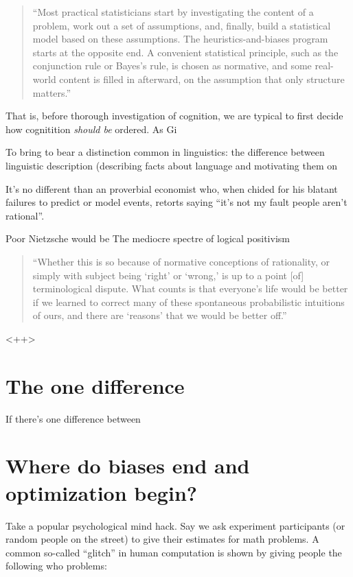 \documentclass{article}
\begin{document}
\begin{quotation}
	``Most practical statisticians start by investigating the content of a problem, work out a set of assumptions, and, finally, build a statistical model based on these assumptions.
	The heuristics-and-biases program starts at the opposite end.
	A convenient statistical principle, such as the conjunction rule or Bayes's rule, is chosen as normative, and some real-world content is filled in afterward, on the assumption that only structure matters.''
\end{quotation}

That is, before thorough investigation of cognition, we are typical to first decide how cognitition \emph{should be} ordered.
As Gi


To bring to bear a distinction common in linguistics: the difference between linguistic description (describing facts about language and motivating them on 


It's no different than an proverbial economist who, when chided for his blatant failures to predict or model events, retorts saying ``it's not my fault people aren't rational''.



Poor Nietzsche would be 
The mediocre spectre of logical positivism



\begin{quotation}
	``Whether this is so because of normative conceptions of rationality, or simply with subject being `right' or `wrong,' is up to a point [of] terminological dispute. What counts is that everyone's life would be better if we learned to correct many of these spontaneous probabilistic intuitions of ours, and there are `reasons' that we would be better off.''
\end{quotation}

<++>

\section{The one difference}

If there's one difference between 



\section{Where do biases end and optimization begin?}

Take a popular psychological mind hack. Say we ask experiment participants (or random people on the street) to give their estimates for math problems. A common so-called ``glitch'' in human computation is shown by giving people the following who problems:
\end{document}

